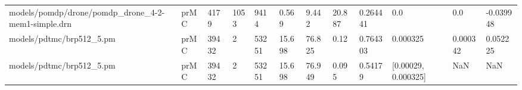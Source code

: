 \begin{tabular}{llllllllllll}
models/pomdp/drone/pomdp\_drone\_4-2-mem1-simple.drn & prMC &   4179 &       1053 &        9414 &          0.569 &            9.442 &                       20.887 &       0.264441 &                                                0.0 &                0.0 &    -0.039948 \\
                          models/pdtmc/brp512\_5.pm & prMC &  39432 &          2 &       53251 &         15.698 &           76.825 &                         0.12 &       0.764303 &                                           0.000325 &           0.000342 &     0.052225 \\
                          models/pdtmc/brp512\_5.pm & prMC &  39432 &          2 &       53251 &         15.698 &           76.949 &                        0.095 &        0.54179 &                                [0.00029, 0.000325] &                NaN &          NaN \\
\bottomrule
\end{tabular}
